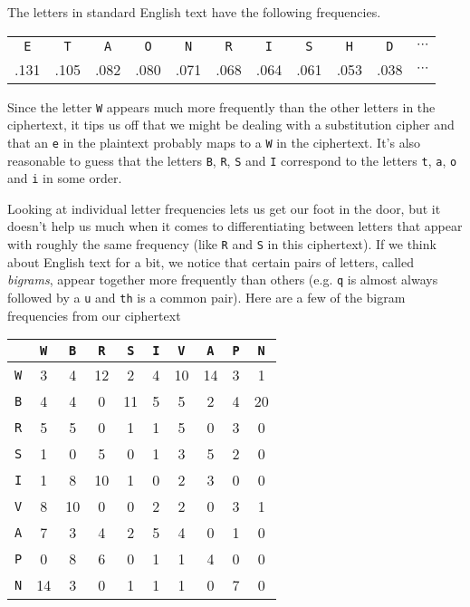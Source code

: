 \documentclass[12pt]{article}
\theoremstyle{plain}
\theoremstyle{definition}
\theoremstyle{remark}
\begin{document}
The letters in standard English text have the following frequencies.

\begin{center}
\begin{tabular}{c c c c c c c c c c c}
    \texttt{E} & \texttt{T} & \texttt{A} & \texttt{O} & \texttt{N} & \texttt{R} & \texttt{I} & \texttt{S} & \texttt{H} & \texttt{D} & $\cdots$\\
    .131 & .105 & .082 & .080 & .071 & .068 & .064 & .061 & .053 & .038 & $\cdots$
\end{tabular}
\end{center}

Since the letter \texttt{W} appears much more frequently than the other letters in the ciphertext, it tips us off that we might be dealing with a substitution cipher and that an \texttt{e} in the plaintext probably maps to a \texttt{W} in the ciphertext. It's also reasonable to guess that the letters \texttt{B}, \texttt{R}, \texttt{S} and \texttt{I} correspond to the letters \texttt{t}, \texttt{a}, \texttt{o} and \texttt{i} in some order.

Looking at individual letter frequencies lets us get our foot in the door, but it doesn't help us much when it comes to differentiating between letters that appear with roughly the same frequency (like \texttt{R} and \texttt{S} in this ciphertext).
If we think about English text for a bit, we notice that certain pairs of letters, called \emph{bigrams}, appear together more frequently than others (e.g. \texttt{q} is almost always followed by a \texttt{u} and \texttt{th} is a common pair).
Here are a few of the bigram frequencies from our ciphertext

\begin{center}
\begin{tabular}{c | c c c c c c c c c}
    &\texttt{W} & \texttt{B} & \texttt{R} & \texttt{S} & \texttt{I} & \texttt{V} & \texttt{A} & \texttt{P} & \texttt{N}\\
    \hline
    \texttt{W} & 3 & 4 & 12 & 2 & 4 & 10 & 14 & 3 & 1\\
    \texttt{B} & 4 & 4 & 0 & 11 & 5 & 5 & 2 & 4 & 20\\
    \texttt{R} & 5 & 5 & 0 & 1 & 1 & 5 & 0 & 3 & 0\\
    \texttt{S} & 1 & 0 & 5 & 0 & 1 & 3 & 5 & 2 & 0\\
    \texttt{I} & 1 & 8 & 10 & 1 & 0 & 2 & 3 & 0 & 0\\
    \texttt{V} & 8 & 10 & 0 & 0 & 2 & 2 & 0 & 3 & 1\\
    \texttt{A} & 7 & 3 & 4 & 2 & 5 & 4 & 0 & 1 & 0\\
    \texttt{P} & 0 & 8 & 6 & 0 & 1 & 1 & 4 & 0 & 0\\
    \texttt{N} & 14 & 3 & 0 & 1 & 1 & 1 & 0 & 7 & 0\\
\end{tabular}
\end{center}
\end{document}

